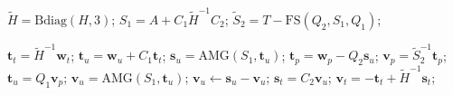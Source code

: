 \documentclass[3p,times]{elsarticle}
\theoremstyle{plain}
\newcommand{\tS}{\widetilde{S}}
\newcommand{\tH}{\widetilde{H}}
\begin{document}
\begin{algorithm}
\caption{ {\sc Preconditioner Construction: t-u-p approach}
[$\tH$, $S_1$, $\tS_2$]=cpt\_tup($\mathcal{J}$).}
\label{alg:cpt_tup}
\begin{algorithmic}[1]
\State $\tH = \text{Bdiag}(H,3)$;
\State $S_1 = A + C_1 \tH^{-1} C_2$;
\State $\tS_2 = T - \text{FS}(Q_2,S_1,Q_1)$;
\end{algorithmic}
\end{algorithm}

\begin{algorithm}
\caption{ {\sc Preconditioner Application: t-u-p approach}
[$\mathbf{v}_u$, $\mathbf{v}_t$, $\mathbf{v}_p$]=app\_tup($\mathcal{J}$, $\tH$, $S_1$, $\tS_2$, $\mathbf{w}_u$, $\mathbf{w}_t$, $\mathbf{w}_p$).}
\label{alg:app_tup}
\begin{algorithmic}[1]
\State $\mathbf{t}_t = \tH^{-1} \mathbf{w}_t$;
\State $\mathbf{t}_u = \mathbf{w}_u + C_1 \mathbf{t}_t$;
\State $\mathbf{s}_u = \text{AMG}(S_1,\mathbf{t}_u)$;
\State $\mathbf{t}_p = \mathbf{w}_p - Q_2 \mathbf{s}_u$;
\State $\mathbf{v}_p = \tS_2^{-1} \mathbf{t}_p$;
\State $\mathbf{t}_u = Q_1 \mathbf{v}_p$;
\State $\mathbf{v}_u = \text{AMG}(S_1, \mathbf{t}_u)$;
\State $\mathbf{v}_u \gets \mathbf{s}_u - \mathbf{v}_u$;
\State $\mathbf{s}_t = C_2 \mathbf{v}_u$;
\State $\mathbf{v}_t = -\mathbf{t}_t + \tH^{-1} \mathbf{s}_t$;
\end{algorithmic}
\end{algorithm}
\end{document}
